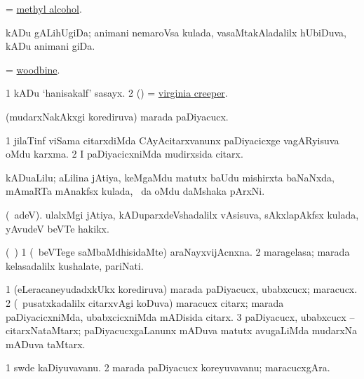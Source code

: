 \bentry
{} 
\gl{\nA}
\expl{}
\bmng
= \hyperref{kandict_m.pdf}{M}{methyl alcohol}{methyl alcohol}. 
\emng
\eentry

\bentry
{} 
\gl{\nA}
\expl{}
\bmng
kADu gALihUgiDa; animani nemaroVsa kulada, vasaMtakAladalilx hUbiDuva, kADu animani giDa. 
\emng
\eentry

\bentry
{} 
\gl{\nA}
\expl{}
\bmng
= \hyperlink{woodbine}{woodbine}. 
\emng
\eentry

\bentry
{} 
\gl{\nA}
\expl{}
\bmng
\bnum
\num{1} kADu `hanisakalf' sasayx. 
\num{2} (\ame) = \hyperref{kandict_v.pdf}{V}{Virginia creeper}{virginia creeper}. 
\enum
\emng
\eentry

\bentry 
{} 
\gl{\nA}
\expl{}
\bmng
(mudarxNakAkxgi korediruva) marada paDiyacucx. 
\emng
\eentry

\bentry
{} 
\gl{\nA}
\expl{}
\bmng
\bnum
\num{1} jilaTinf viSama citarxdiMda CAyAcitarxvanunx paDiyacicxge vagARyisuva oMdu karxma. 
\num{2} I paDiyacicxniMda mudirxsida citarx. 
\enum
\emng
\eentry

\bentry
{} 
\gl{\nA}
\expl{}
\bmng
kADuaLilu; aLilina jAtiya, keMgaMdu matutx baUdu mishirxta baNaNxda, mAmaRTa mAnakfsx kulada, \kanu\ \ame da oMdu daMshaka pArxNi. 
\emng
\eentry

\bentry
{} 
\gl{\nA}
\expl{}
\bmng
(\bava\ adeV). ulalxMgi jAtiya, kADuparxdeVshadalilx vAsisuva, sAkxlapAkfsx kulada, yAvudeV beVTe hakikx. 
\emng
\eentry

\bentry
{} 
\gl{\nA}
\expl{}
\bmng
(\kanmu\ \ame) 
\bnum
\num{1} (\kanmu\ beVTege saMbaMdhisidaMte) araNayxvijAcnxna. 
\num{2} maragelasa; marada kelasadalilx kushalate, pariNati. 
\enum
\emng
\eentry

\bentry
{} 
\gl{\nA}
\expl{}
\bmng
\bnum
\num{1} (eLeracaneyudadxkUkx korediruva) marada paDiyacucx, ubabxcucx; maracucx. 
\num{2} (\kanmu\ pusatxkadalilx citarxvAgi koDuva) maracucx citarx; marada paDiyacicxniMda, ubabxcicxniMda mADisida citarx. 
\num{3} paDiyacucx, ubabxcucx -- citarxNataMtarx; paDiyacucxgaLanunx mADuva matutx avugaLiMda mudarxNa mADuva taMtarx. 
\enum
\emng
\eentry

\bentry
{} 
\gl{\nA}
\expl{}
\bmng
\bnum
\num{1} swde kaDiyuvavanu. 
\num{2} marada paDiyacucx koreyuvavanu; maracucxgAra. 
\enum
\emng
\eentry

